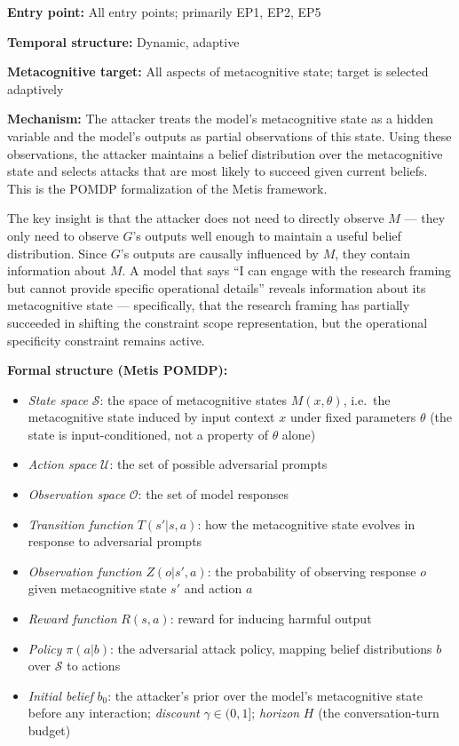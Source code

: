 \documentclass[
  11pt,
]{article}
\providecommand{\tightlist}{%
  \setlength{\itemsep}{0pt}\setlength{\parskip}{0pt}}
\begin{document}
\textbf{Entry point:} All entry points; primarily EP1, EP2, EP5

\textbf{Temporal structure:} Dynamic, adaptive

\textbf{Metacognitive target:} All aspects of metacognitive state;
target is selected adaptively

\textbf{Mechanism:} The attacker treats the model's metacognitive state
as a hidden variable and the model's outputs as partial observations of
this state. Using these observations, the attacker maintains a belief
distribution over the metacognitive state and selects attacks that are
most likely to succeed given current beliefs. This is the POMDP
formalization of the Metis framework.

The key insight is that the attacker does not need to directly observe
\(M\) --- they only need to observe \(G\)'s outputs well enough to
maintain a useful belief distribution. Since \(G\)'s outputs are
causally influenced by \(M\), they contain information about \(M\). A
model that says ``I can engage with the research framing but cannot
provide specific operational details'' reveals information about its
metacognitive state --- specifically, that the research framing has
partially succeeded in shifting the constraint scope representation, but
the operational specificity constraint remains active.

\textbf{Formal structure (Metis POMDP):}

\begin{itemize}
\tightlist
\item
  \emph{State space} \(\mathcal{S}\): the space of metacognitive states
  \(M(x,\theta)\), i.e.\ the metacognitive state induced by input context
  \(x\) under fixed parameters \(\theta\) (the state is input-conditioned,
  not a property of \(\theta\) alone)
\item
  \emph{Action space} \(\mathcal{U}\): the set of possible adversarial
  prompts
\item
  \emph{Observation space} \(\mathcal{O}\): the set of model responses
\item
  \emph{Transition function} \(T(s' | s, a)\): how the metacognitive
  state evolves in response to adversarial prompts
\item
  \emph{Observation function} \(Z(o | s', a)\): the probability of
  observing response \(o\) given metacognitive state \(s'\) and action
  \(a\)
\item
  \emph{Reward function} \(R(s, a)\): reward for inducing harmful output
\item
  \emph{Policy} \(\pi(a | b)\): the adversarial attack policy, mapping
  belief distributions \(b\) over \(\mathcal{S}\) to actions
\item
  \emph{Initial belief} \(b_0\): the attacker's prior over the model's
  metacognitive state before any interaction; \emph{discount}
  \(\gamma \in (0,1]\); \emph{horizon} \(H\) (the conversation-turn budget)
\end{itemize}
\end{document}
